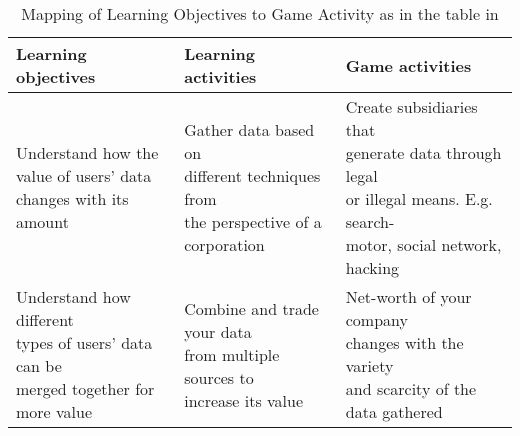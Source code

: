\documentclass{article}
\begin{document}
\begin{table}[H]
    \caption{Mapping of Learning Objectives to Game Activity as in the table in} %
    \label{tab:learningobjectives}
    \centering
    \addtolength{\leftskip}{-12cm}
    \addtolength{\rightskip}{-12cm}
    \begin{tabular}{lll}
        \toprule
        \textbf{Learning objectives}  & \textbf{Learning activities} & \textbf{Game activities}\\\midrule%
        
        \makecell[l]{
        Understand how the\\
        value of users’ data\\ 
        changes with its amount} & 
        \makecell[l]{
        Gather data based on\\
        different techniques from\\
        the perspective of a \\
        corporation} & 
        \makecell[l]{
        Create subsidiaries that\\
        generate data through legal \\
        or illegal means. E.g. search-\\
        motor, social network, hacking}\\\midrule 
        
        \makecell[l]{
        Understand how different \\
        types of users’ data can be\\
        merged together for more value} & 
        \makecell[l]{
        Combine and trade your data\\
        from multiple sources to\\
        increase its value} & 
        \makecell[l]{
        Net-worth of your company\\
        changes with the variety \\ 
        and scarcity of the data gathered} \\\bottomrule
    \end{tabular}
\end{table}
\end{document}
